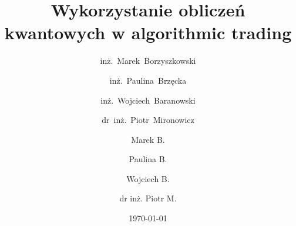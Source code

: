 \documentclass[polish,aspectratio=169]{beamer}
\title[Wykorzystanie obliczeń kwantowych w algorithmic trading]{Wykorzystanie obliczeń kwantowych w algorithmic trading}
\subtitle{}
\author{inż.~Marek~Borzyszkowski \and inż.~Paulina~Brzęcka \and inż.~Wojciech~Baranowski \and dr~inż.~Piotr~Mironowicz}
\date{\today}
\begin{document}
        
\author{Marek B. \and Paulina B. \and Wojciech B. \and dr inż. Piotr M. }



% 


\end{document}
